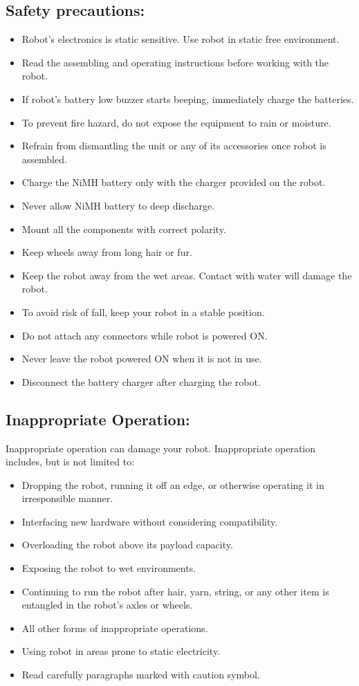 \documentclass[a4paper,10pt,oneside]{article}
\begin{document}
{	\subsection{\textbf{Safety precautions:}}
	\begin{itemize}

	\item  Robot’s electronics is static sensitive. Use robot in static free environment.
	\item Read the assembling and operating instructions before working with the robot.
	\item If robot’s battery low buzzer starts beeping, immediately charge the batteries.
	\item To prevent fire hazard, do not expose the equipment to rain or moisture.
	\item Refrain from dismantling the unit or any of its accessories once robot is assembled.
	\item Charge the NiMH battery only with the charger provided on the robot.
	\item Never allow NiMH battery to deep discharge.
	\item Mount all the components with correct polarity.
	\item Keep wheels away from long hair or fur.
	\item Keep the robot away from the wet areas. Contact with water will damage the robot.
	\item To avoid risk of fall, keep your robot in a stable position.
	\item Do not attach any connectors while robot is powered ON.
	\item Never leave the robot powered ON when it is not in use.
	\item Disconnect the battery charger after charging the robot. 
\end{itemize}
	\subsection{\textbf{Inappropriate Operation:}}
	Inappropriate operation can damage your robot. Inappropriate operation includes, but is not
	limited to:
	\begin{itemize}
	\item Dropping the robot, running it off an edge, or otherwise operating it in irresponsible
	manner.
	\item Interfacing new hardware without considering compatibility.
	\item Overloading the robot above its payload capacity.
	\item Exposing the robot to wet environments.
	\item Continuing to run the robot after hair, yarn, string, or any other item is entangled in the
	robot’s axles or wheels.
	\item All other forms of inappropriate operations.
	\item Using robot in areas prone to static electricity.
	\item Read carefully paragraphs marked with caution symbol.
	\end{itemize}
}
\end{document}

